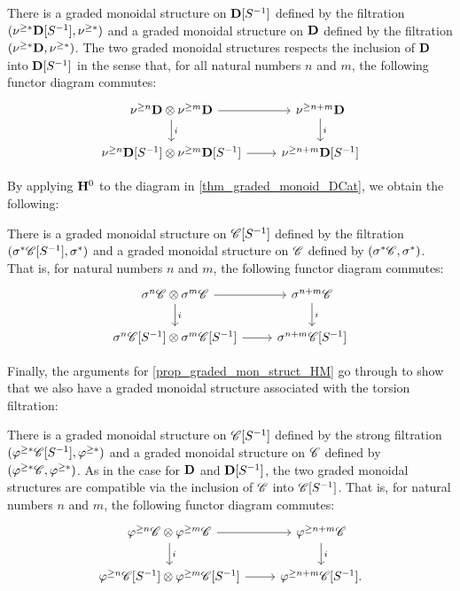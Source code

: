 \begin{thm}\label{thm_graded_monoid_DCat}
There is a graded monoidal structure on $\mathbf{D}[S^{-1}]$ defined by
the filtration $(\nu^{\geq *}\mathbf{D}[S^{-1}], \nu^{\geq *})$ and a 
graded monoidal structure on $\mathbf{D}$ defined by the filtration
$(\nu^{\geq *}\mathbf{D}, \nu^{\geq *})$. The two graded monoidal 
structures respects the inclusion of $\mathbf{D}$ into $\mathbf{D}[S^{-1}]$ in 
the sense that, for all natural numbers $n$ and $m$, the following 
functor diagram commutes:
\[
\begin{tikzcd}
\preradD{n}\DCat \tensor \preradD{m}\DCat \arrow{r} \arrow{d}{i} &
\preradD{n + m}\DCat \arrow{d}{i} \\
\preradD{n}\DCatLoc{S} \tensor \preradD{m}\DCatLoc{S} \arrow{r} &
\preradD{n + m}\DCatLoc{S}
\end{tikzcd}
\]
\end{thm}

By applying $\mathbf{H}^0$ to the diagram in \ref{thm_graded_monoid_DCat},
we obtain the following:

\begin{cor}
There is a graded monoidal structure on $\mathscr{C}[{S}^{-1}]$ defined
by the filtration $(\sigma^{*}\mathscr{C}[{S}^{-1}], \sigma^{*})$ and a graded 
monoidal structure on $\mathscr{C}$ defined by $(\sigma^{*}\mathscr{C}, 
\sigma^{*})$. That is, for natural numbers $n$ and $m$, the 
following functor diagram commutes:
\[
\begin{tikzcd}
\sgHI{n}\Cat{C} \tensor \sgHI{m}\Cat{C} \arrow{r} \arrow{d}{i} &
\sgHI{n + m}\Cat{C} \arrow{d}{i} \\
\sgHI{n}\CatLoc{C}{S} \tensor \sgHI{m}\CatLoc{C}{S} \arrow{r} &
\sgHI{n + m}\CatLoc{C}{S}
\end{tikzcd}
\]
\end{cor}

Finally, the arguments for \ref{prop_graded_mon_struct_HM} go 
through to show that we also have a graded monoidal structure 
associated with the torsion filtration:

\begin{thm}
There is a graded monoidal structure on $\mathscr{C}[{S}^{-1}]$ defined
by the strong filtration $(\varphi^{\geq *}\mathscr{C}[{S}^{-1}], \varphi^{\geq *})$ 
and a graded monoidal structure on $\mathscr{C}$ defined by 
$(\varphi^{\geq *}\mathscr{C}, \varphi^{\geq *})$. As in the case for $\mathbf{D}$ and 
$\mathbf{D}[S^{-1}]$, the two graded monoidal structures are compatible 
via the inclusion of $\mathscr{C}$ into $\mathscr{C}[{S}^{-1}]$. That is, for 
natural numbers $n$ and $m$, the following functor diagram 
commutes:
\[
\begin{tikzcd}
\prerad{n}\Cat{C} \tensor \prerad{m}\Cat{C} \arrow{r} \arrow{d}{i} &
\prerad{n + m}\Cat{C} \arrow{d}{i} \\
\prerad{n}\CatLoc{C}{S} \tensor \prerad{m}\CatLoc{C}{S} \arrow{r} &
\prerad{n + m}\CatLoc{C}{S}.
\end{tikzcd}
\]
\end{thm}
